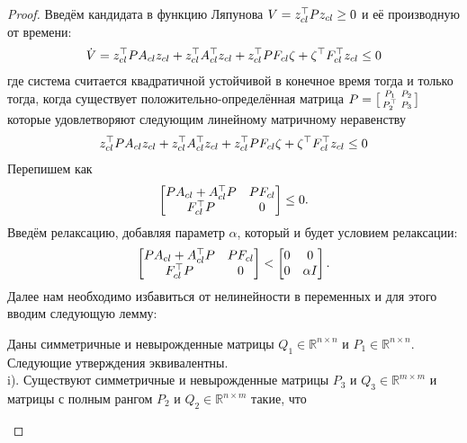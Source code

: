 \begin{proof}
	Введём кандидата в функцию Ляпунова ${V} = {z}_{cl}^\top {P}{z}_{cl} \geq 0$ и её производную от времени:
	\begin{align}
		{\dot{V}} = {z}_{cl}^\top {P} {A}_{cl} {z}_{cl} +
		{z}_{cl}^\top {A}_{cl}^\top {z}_{cl} 
		+
		{z}_{cl}^\top {P} {F}_{cl} {\zeta} +
		{\zeta}^\top {F}_{cl}^\top {z}_{cl}
		\leq 0
	\end{align}
	где система считается квадратичной устойчивой в конечное время тогда и только тогда, когда существует положительно-определённая матрица ${P} = \bigl[ \begin{smallmatrix}  {P}_1 & {P}_2 \\ {P}_2^\top & {P}_3 \end{smallmatrix} \bigr]$ которые удовлетворяют следующим линейному матричному неравенству
	\begin{align}
		{z}_{cl}^\top {P} {A}_{cl} {z}_{cl} +
		{z}_{cl}^\top {A}_{cl}^\top {z}_{cl} 
		+
		{z}_{cl}^\top {P} {F}_{cl} {\zeta} +
		{\zeta}^\top {F}_{cl}^\top {z}_{cl}
		\leq 0
	\end{align}
	Перепишем как
	\begin{align}
		\begin{bmatrix}
			{P} {A}_{cl} + {A}_{cl}^\top {P} & {P} {F}_{cl} \\
			{F}_{cl} ^\top {P} & 0
		\end{bmatrix} \leq 0.
	\end{align}
	Введём релаксацию, добавляя параметр $\alpha$, который и будет условием релаксации:
	\begin{align}\label{eq: S procedure}
		\begin{bmatrix}
			{P} {A}_{cl} + {A}_{cl}^\top {P} & {P} {F}_{cl} \\
			{F}_{cl} ^\top {P} & 0
		\end{bmatrix} < 
		\begin{bmatrix}
			0 & 0\\
			0 & \alpha {I}
		\end{bmatrix}.
	\end{align}
	Далее нам необходимо избавиться от нелинейности в переменных и для этого вводим следующую лемму:
	\begin{lemma}
		Даны симметричные и невырожденные матрицы ${Q}_{1} \in \mathbb{R}^{n\times n}$ и ${P}_{1} \in \mathbb{R}^{n\times n}$. Следующие утверждения эквивалентны.\\
		
		i). Существуют симметричные и невырожденные матрицы  ${P}_{3}$ и ${Q}_{3} \in \mathbb{R}^{m\times m}$ и матрицы с полным рангом ${P}_{2}$ и ${Q}_{2} \in \mathbb{R}^{n\times m}$ такие, что
		

\end{lemma}
\end{proof}
